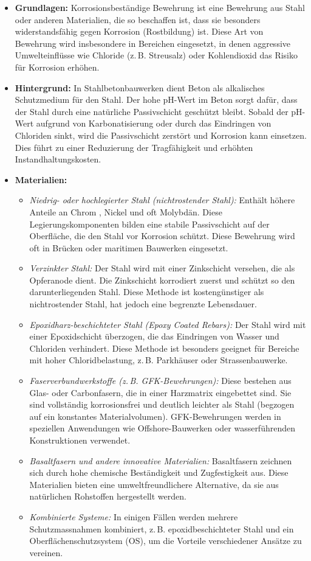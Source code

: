 \documentclass[
11pt,
captions=tableheading,
headsepline,
footsepline, 
captions=tableheading,
parskip=half-,
]{scrartcl}
\begin{document}
\begin{itemize}
    \item \textbf{Grundlagen:} Korrosionsbeständige Bewehrung ist eine Bewehrung aus Stahl oder anderen Materialien, die so beschaffen ist, dass sie besonders widerstandsfähig gegen Korrosion (Rostbildung) ist. Diese Art von Bewehrung wird insbesondere in Bereichen eingesetzt, in denen aggressive Umwelteinflüsse wie Chloride (z.\,B. Streusalz) oder Kohlendioxid das Risiko für Korrosion erhöhen.
    
    \item \textbf{Hintergrund:} In Stahlbetonbauwerken dient Beton als alkalisches Schutzmedium für den Stahl. Der hohe pH-Wert im Beton sorgt dafür, dass der Stahl durch eine natürliche Passivschicht geschützt bleibt. Sobald der pH-Wert aufgrund von Karbonatisierung oder durch das Eindringen von Chloriden sinkt, wird die Passivschicht zerstört und Korrosion kann einsetzen. Dies führt zu einer Reduzierung der Tragfähigkeit und erhöhten Instandhaltungskosten.

    \item \textbf{Materialien:}
    \begin{itemize}
        \item \textit{Niedrig- oder hochlegierter Stahl (nichtrostender Stahl):} Enthält höhere Anteile an Chrom , Nickel und oft Molybdän. Diese Legierungskomponenten bilden eine stabile Passivschicht auf der Oberfläche, die den Stahl vor Korrosion schützt. Diese Bewehrung wird oft in Brücken oder maritimen Bauwerken eingesetzt.
        \item \textit{Verzinkter Stahl:} Der Stahl wird mit einer Zinkschicht versehen, die als Opferanode dient. Die Zinkschicht korrodiert zuerst und schützt so den darunterliegenden Stahl. Diese Methode ist kostengünstiger als nichtrostender Stahl, hat jedoch eine begrenzte Lebensdauer.
        \item \textit{Epoxidharz-beschichteter Stahl (Epoxy Coated Rebars):} Der Stahl wird mit einer Epoxidschicht überzogen, die das Eindringen von Wasser und Chloriden verhindert. Diese Methode ist besonders geeignet für Bereiche mit hoher Chloridbelastung, z.\,B. Parkhäuser oder Strassenbauwerke.
        \item \textit{Faserverbundwerkstoffe (z.\,B. GFK-Bewehrungen):} Diese bestehen aus Glas- oder Carbonfasern, die in einer Harzmatrix eingebettet sind. Sie sind vollständig korrosionsfrei und deutlich leichter als Stahl (begzogen auf ein konstantes Materialvolumen). GFK-Bewehrungen werden in speziellen Anwendungen wie Offshore-Bauwerken oder wasserführenden Konstruktionen verwendet.
        \item \textit{Basaltfasern und andere innovative Materialien:} Basaltfasern zeichnen sich durch hohe chemische Beständigkeit und Zugfestigkeit aus. Diese Materialien bieten eine umweltfreundlichere Alternative, da sie aus natürlichen Rohstoffen hergestellt werden.
        \item \textit{Kombinierte Systeme:} In einigen Fällen werden mehrere Schutzmassnahmen kombiniert, z.\,B. epoxidbeschichteter Stahl und ein Oberflächenschutzsystem (OS), um die Vorteile verschiedener Ansätze zu vereinen.
    \end{itemize}
    

\end{itemize}
\end{document}
